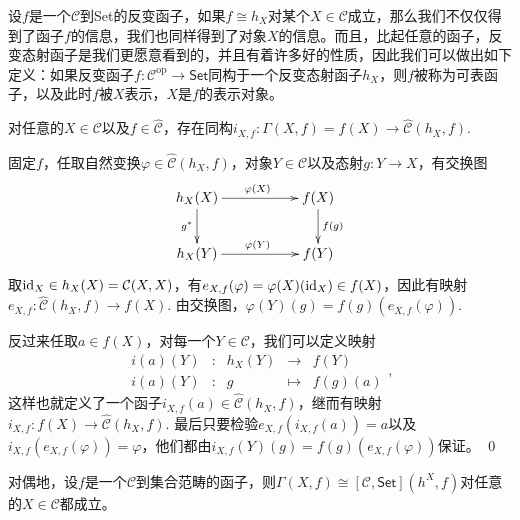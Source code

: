 设$f$是一个$\mathcal{C}$到Set的反变函子，如果$f\cong h_X$对某个$X\in \mathcal{C}$成立，那么我们不仅仅得到了函子$f$的信息，我们也同样得到了对象$X$的信息。而且，比起任意的函子，反变态射函子是我们更愿意看到的，并且有着许多好的性质，因此我们可以做出如下定义：如果反变函子$f:\mathcal{C}^{\text{op}}\to \mathsf{Set}$同构于一个反变态射函子$h_X$，则$f$被称为可表函子，以及此时$f$被$X$表示，$X$是$f$的表示对象。

\lem 对任意的$X\in \mathcal{C}$以及$f\in \hat{\mathcal{C}}$，存在同构$i_{X,f}:\Gamma(X,f)=f(X)\to {\hat{\mathcal{C}}}(h_X,f)$.

\proof
	固定$f$，任取自然变换$\varphi\in {\hat{\mathcal{C}}}(h_X,f)$，对象$Y\in\mathcal{C}$以及态射$g:Y\to X$，有交换图
	\[
	\begin{xy}
		\xymatrix{
			h_X(X)\ar[rr]^{\varphi(X)} \ar[d]_{g^*}&&f(X) \ar[d]^{f(g)}\\
			h_X(Y)\ar[rr]^{\varphi(Y)}&&f(Y)
		}
	\end{xy}
	\]
	取$\operatorname{id}_X\in h_X(X)=\mathcal{C}(X,X)$，有$e_{X,f}(\varphi)=\varphi(X)(\operatorname{id}_X)\in f(X)$，因此有映射$e_{X,f}:{\hat{\mathcal{C}}}(h_X,f)\to f(X)$. 由交换图，$\varphi(Y)(g)=f(g)\left(e_{X,f}(\varphi)\right)$.

	反过来任取$a\in f(X)$，对每一个$Y\in\mathcal{C}$，我们可以定义映射
	\[
	\begin{array}{ccccc}
	i(a)(Y)&:&h_X(Y)&\to &f(Y)\\
	i(a)(Y)&:&g&\mapsto&f(g)(a)
	\end{array},
	\]
	这样也就定义了一个函子$i_{X,f}(a)\in {\hat{\mathcal{C}}}(h_X,f)$，继而有映射$i_{X,f}:f(X)\to {\hat{\mathcal{C}}}(h_X,f)$. 最后只要检验$e_{X,f}(i_{X,f}(a))=a$以及$i_{X,f}(e_{X,f}(\varphi))=\varphi$，他们都由$i_{X,f}(Y)(g)=f(g)\left(e_{X,f}(\varphi)\right)$保证。
\qed

对偶地，设$f$是一个$\mathcal{C}$到集合范畴的函子，则$\Gamma(X,f)\cong [\mathcal{C},\mathsf{Set}](h^X,f)$对任意的$X\in \mathcal{C}$都成立。



